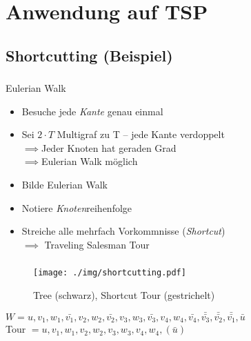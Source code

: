 \section{Anwendung auf TSP}

\subsection{Shortcutting (Beispiel)}

\begin{frame}
    \frametitle{\insertsubsection}
    \begin{block}{Eulerian Walk}
        \vspace{0.5em}
        \begin{itemize}
            \itemsep\setlength{0.7em}
            \item Besuche jede \emph{Kante} genau einmal
            \item Sei $2 \cdot T$ Multigraf zu T -- jede Kante verdoppelt\\$\implies$Jeder Knoten hat geraden Grad \\$\implies$Eulerian Walk möglich
        \end{itemize}
    \vspace{.8em}
    \end{block}
    \begin{itemize}
        \itemsep\setlength{0.7em}
        \item Bilde Eulerian Walk
        \item Notiere \emph{Knoten}reihenfolge
        \item Streiche alle mehrfach Vorkommnisse (\emph{Shortcut})\\$\implies$ Traveling Salesman Tour
    \end{itemize}
\end{frame}

\begin{frame}
    \frametitle{\insertsubsection}
    \begin{figure}
        \centering
        \texttt{[image: ./img/shortcutting.pdf]}
        \caption{Tree (schwarz), Shortcut Tour (gestrichelt) \cite{recourse2016}}
    \end{figure}
    $W = u, v_1, w_1, \bar{v_1}, v_2, w_2, \bar{v_2}, v_3, w_3, \bar{v_3}, v_4, w_4, \bar{v_4}, \bar{\bar{v_3}}, \bar{\bar{v_2}}, \bar{\bar{v_1}}, \bar{u}$\\
    Tour $= u, v_1, w_1, v_2, w_2 ,v_3, w_3, v_4, w_4, (\bar{u})$
\end{frame}

